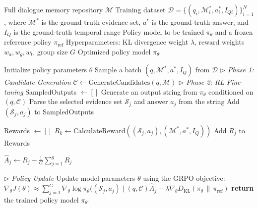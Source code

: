 \documentclass{article} %
\begin{document}
\begin{algorithm}[t!]
\caption{\textsc{Memory-T1} Training Procedure}
\label{alg:training}
\begin{algorithmic}[1]
\Require
\Statex Full dialogue memory repository $\mathcal{M}$
\Statex Training dataset $\mathcal{D} = \{(q_i, \mathcal{M}^*_i, a^*_i, I_{Qi})\}_{i=1}^N$, where $\mathcal{M}^*$ is the ground-truth evidence set, $a^*$ is the ground-truth answer, and $I_Q$ is the ground-truth temporal range
\Statex Policy model to be trained $\pi_\theta$ and a frozen reference policy $\pi_{\text{ref}}$
\Statex Hyperparameters: KL divergence weight $\lambda$, reward weights $w_a, w_g, w_t$, group size $G$
\Ensure
\Statex Optimized policy model $\pi_{\theta'}$

    \State Initialize policy parameters $\theta$
        \State Sample a batch $(q, \mathcal{M}^*, a^*, I_Q)$ from $\mathcal{D}$
        \Statex \textit{\quad $\rhd$ Phase 1: Candidate Generation}
        \State $\mathcal{C} \leftarrow \text{GenerateCandidates}(q, \mathcal{M})$ 
        \Statex \textit{\quad $\rhd$ Phase 2: RL Fine-tuning}
        \State SampledOutputs $\leftarrow []$
         
            \State Generate an output string from $\pi_\theta$ conditioned on $(q, \mathcal{C})$
            \State Parse the selected evidence set $\mathcal{S}_j$ and answer $a_j$ from the string
            \State Add $(\mathcal{S}_j, a_j)$ to SampledOutputs
        \EndFor
        
        \State Rewards $\leftarrow []$
         
            \State $R_k \leftarrow \text{CalculateReward}((\mathcal{S}_j, a_j), (\mathcal{M}^*, a^*, I_Q))$ 
            \State Add $R_j$ to Rewards
        \EndFor

         
            \State $\hat{A}_j \leftarrow R_j - \frac{1}{G}\sum_{j=1}^{g}R_j$ 
        \EndFor

        \Statex \textit{\quad $\rhd$ Policy Update}
        \State Update model parameters $\theta$ using the GRPO objective:
        \State $\nabla_\theta J(\theta) \approx \sum_{j=1}^G \nabla_\theta \log \pi_\theta((\mathcal{S}_j, a_j) \mid (q, \mathcal{C}) \hat{A}_j - \lambda \nabla_\theta D_{\text{KL}}(\pi_\theta \,\|\, \pi_{\text{ref}})$
    \EndFor
    \State \textbf{return} the trained policy model $\pi_{\theta'}$
\EndFunction
\end{algorithmic}
\end{algorithm}
\end{document}
